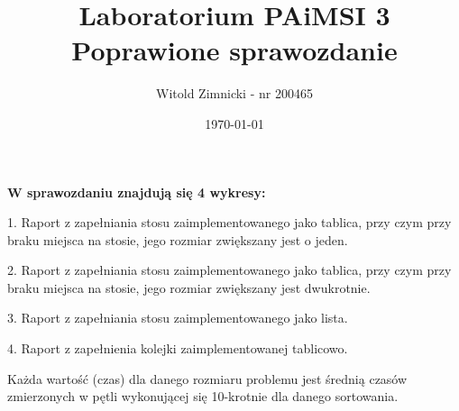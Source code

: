 \documentclass[12pt,a4paper,titlepage]{article}
\title{Laboratorium PAiMSI 3
\newline
\newline
Poprawione sprawozdanie}
\date{\today}
\author{Witold Zimnicki - nr 200465}
\begin{document}
	\maketitle
	\pagestyle{empty}
	\pagestyle{headings}
	
	\textbf{W sprawozdaniu znajdują się 4 wykresy:}\newline
	
	1. Raport z zapełniania stosu zaimplementowanego jako tablica, przy czym przy
braku miejsca na stosie, jego rozmiar zwiększany jest o jeden. \newline
	 
	2. Raport z zapełniania stosu zaimplementowanego jako tablica, przy czym przy
braku miejsca na stosie, jego rozmiar zwiększany jest dwukrotnie. \newline
	
	3. Raport z zapełniania stosu zaimplementowanego jako lista. \newline
	
	4. Raport z zapełnienia kolejki zaimplementowanej tablicowo. \newline
	
	
	Każda wartość (czas) dla danego rozmiaru problemu jest średnią czasów zmierzonych w pętli wykonującej się 10-krotnie dla danego sortowania. \newline
	

	
	
\end{document}
